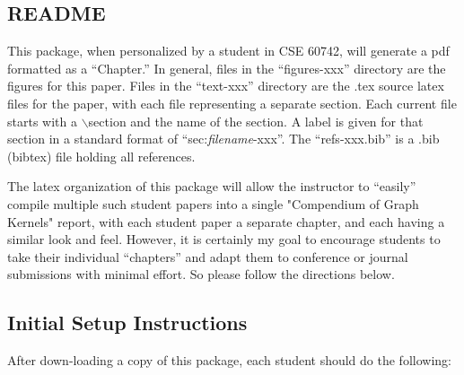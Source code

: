 \subsection{README}

This package, when personalized by a student in CSE 60742, will generate a pdf formatted as a ``Chapter.'' In general, files in the ``figures-xxx'' directory are the figures for this paper. Files in the  ``text-xxx'' directory are the .tex source latex files for the paper, with each file representing a separate section. Each current file starts with a $\backslash$section and the name of the section. A label is given for that section in a standard format of ``sec:\textit{filename}-xxx''. The ``refs-xxx.bib'' is a .bib (bibtex) file holding all references.

The latex organization of this package will allow the instructor to ``easily'' compile multiple such student papers into a single "Compendium of Graph Kernels" report, with each student paper a separate chapter, and each having a similar look and feel. However, it is certainly my goal to encourage students to take their individual ``chapters'' and adapt them to conference or journal submissions with minimal effort. So please follow the directions below.

\subsection{Initial Setup Instructions}

After down-loading a copy of this package, each student should do the following:

